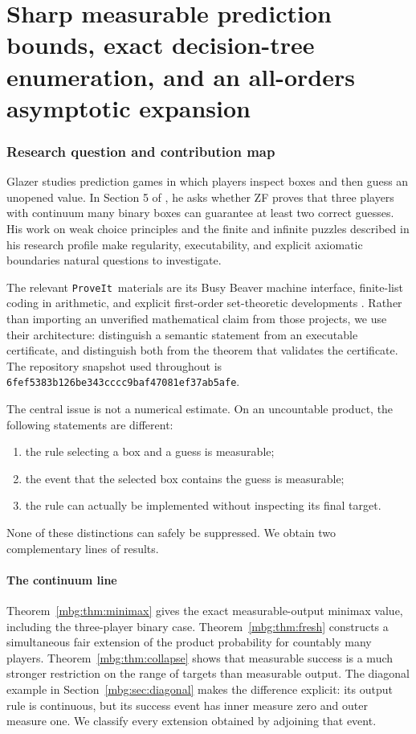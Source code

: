 \documentclass[11pt,letterpaper]{article}
\theoremstyle{definition}
\newcommand{\repo}{\texttt{ProveIt}}
\newcommand{\commit}{\nolinkurl{6fef5383b126be343cccc9baf47081ef37ab5afe}}
\begin{document}
\part{Sharp measurable prediction bounds, exact decision-tree enumeration, and an all-orders asymptotic expansion}
\label{mbg:part:one}

\section{Research question and contribution map}

Glazer studies prediction games in which players inspect boxes and then guess an unopened value. In Section 5 of \cite{GlazerBox}, he asks whether ZF proves that three players with continuum many binary boxes can guarantee at least two correct guesses. His work on weak choice principles \cite{GlazerChoice} and the finite and infinite puzzles described in his research profile \cite{GlazerProfile} make regularity, executability, and explicit axiomatic boundaries natural questions to investigate.

The relevant \repo\ materials are its Busy Beaver machine interface, finite-list coding in arithmetic, and explicit first-order set-theoretic developments \cite{ProveIt,BusyBeaver,ListCoding,Closure}. Rather than importing an unverified mathematical claim from those projects, we use their architecture: distinguish a semantic statement from an executable certificate, and distinguish both from the theorem that validates the certificate. The repository snapshot used throughout is \commit.

The central issue is not a numerical estimate. On an uncountable product, the following statements are different:
\begin{enumerate}[label=(\roman*)]
\item the rule selecting a box and a guess is measurable;
\item the event that the selected box contains the guess is measurable;
\item the rule can actually be implemented without inspecting its final target.
\end{enumerate}
None of these distinctions can safely be suppressed. We obtain two complementary lines of results.

\subsection{The continuum line}
Theorem~\ref{mbg:thm:minimax} gives the exact measurable-output minimax value, including the three-player binary case. Theorem~\ref{mbg:thm:fresh} constructs a simultaneous fair extension of the product probability for countably many players. Theorem~\ref{mbg:thm:collapse} shows that measurable success is a much stronger restriction on the range of targets than measurable output. The diagonal example in Section~\ref{mbg:sec:diagonal} makes the difference explicit: its output rule is continuous, but its success event has inner measure zero and outer measure one. We classify every extension obtained by adjoining that event.
\end{document}
